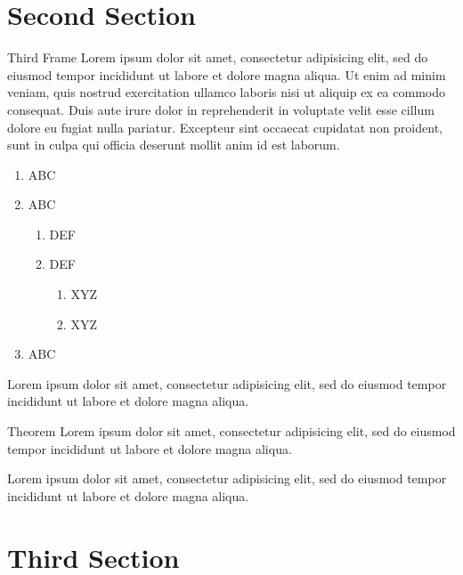 \section{Second Section}

\begin{frame}{Third Frame}
    Lorem ipsum dolor sit amet, consectetur adipisicing elit, sed do eiusmod
    tempor incididunt ut labore et dolore magna aliqua. Ut enim ad minim veniam,
    quis nostrud exercitation ullamco laboris nisi ut aliquip ex ea commodo
    consequat. Duis aute irure dolor in reprehenderit in voluptate velit esse
    cillum dolore eu fugiat nulla pariatur. Excepteur sint occaecat cupidatat non
    proident, sunt in culpa qui officia deserunt mollit anim id est laborum.

    \begin{enumerate}
        \item ABC
        \item ABC
        \begin{enumerate}
            \item DEF
            \item DEF
            \begin{enumerate}
                \item XYZ
                \item XYZ
            \end{enumerate}
        \end{enumerate}
        \item ABC
    \end{enumerate}
\end{frame}

\begin{frame}
    Lorem ipsum dolor sit amet, consectetur adipisicing elit, sed do eiusmod tempor incididunt ut labore et dolore magna aliqua.

    \begin{block}{Theorem}
        Lorem ipsum dolor sit amet, consectetur adipisicing elit, sed do eiusmod tempor incididunt ut labore et dolore magna aliqua.
    \end{block}

    Lorem ipsum dolor sit amet, consectetur adipisicing elit, sed do eiusmod tempor incididunt ut labore et dolore magna aliqua.
\end{frame}

\section{Third Section}

